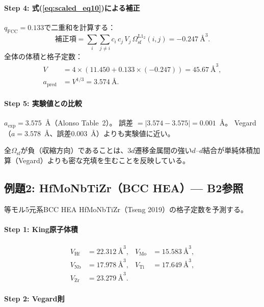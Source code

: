 \documentclass[5p,10pt]{elsarticle}
\begin{document}
\paragraph{Step 4: 式(\ref{eq:scaled_eq10})による補正}

$q_\text{FCC} = 0.133$で二重和を計算する：
\begin{equation}
\text{補正項} = \sum_i \sum_{j \ne i} c_i\,c_j\,V_j\,\Omega_\text{sf}^{\text{L1}_2}(i,j)
= -0.247~\text{\AA}^3.
\label{eq:ex_correction_fcc}
\end{equation}
全体の体積と格子定数：
\begin{align}
V &= 4 \times (11.450 + 0.133 \times (-0.247)) = 45.67~\text{\AA}^3, \nonumber \\
a_\text{pred} &= V^{1/3} = 3.574~\text{\AA}. \label{eq:ex_pred_fcc}
\end{align}

\paragraph{Step 5: 実験値との比較}

$a_\text{exp} = 3.575$~\AA{}（Alonso Table~2）。
誤差 $= |3.574 - 3.575| = 0.001$~\AA{}。
Vegard（$a = 3.578$~\AA、誤差0.003~\AA）よりも実験値に近い。

\medskip
\noindent
全$\Omega_\text{sf}$が負（収縮方向）であることは、3$d$遷移金属間の強い$d$--$d$結合が単純体積加算（Vegard）よりも密な充填を生むことを反映している。


\subsection{例題2: HfMoNbTiZr（BCC HEA）--- B2参照}
\label{sec:example_bcc}

等モル5元系BCC HEA HfMoNbTiZr（Tseng 2019）の格子定数を予測する。

\paragraph{Step 1: King原子体積}
\begin{align*}
V_\text{Hf} &= 22.312~\text{\AA}^3, & V_\text{Mo} &= 15.583~\text{\AA}^3, \\
V_\text{Nb} &= 17.978~\text{\AA}^3, & V_\text{Ti} &= 17.649~\text{\AA}^3, \\
V_\text{Zr} &= 23.279~\text{\AA}^3. &
\end{align*}

\paragraph{Step 2: Vegard則}
\end{document}

